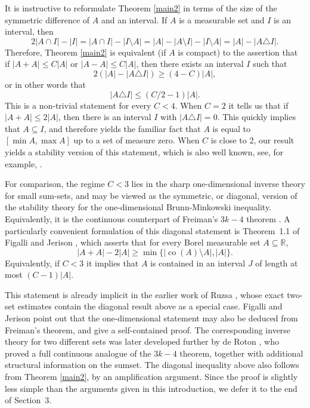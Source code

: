 \documentclass[11pt,reqno]{amsart}
\theoremstyle{definition}
\def\subset{\subseteq}
\begin{document}
It is instructive to reformulate Theorem \ref{main2} in terms of the size of the symmetric difference of $A$ and an interval. If $A$ is a measurable set and $I$ is an interval, then 
\[2|A\cap I|-|I|=|A\cap I|-|I\setminus A|=|A|-|A\setminus I|-|I\setminus A|=|A|-|A\triangle I|.\]
Therefore, Theorem \ref{main2} is equivalent (if $A$ is compact) to the assertion that if $|A+A|\leq C|A|$ or $|A-A|\leq C|A|$, then there exists an interval $I$ such that 
\[2(|A|-|A\triangle I|)\geq (4-C)|A|,\]
or in other words that
\[|A\triangle I|\leq(C/2-1)|A|.\]
This is a non-trivial statement for every $C<4$. When $C=2$ it tells us that if $|A+A|\leq 2|A|$, then there is an interval $I$ with $|A\triangle I|=0$. This quickly implies that $A\subset I$, and therefore yields the familiar fact that $A$ is equal to $[\min A,\max A]$ up to a set of measure zero. When $C$ is close to 2, our result yields a stability version of this statement, which is also well known, see, for example, \cite[Corollary~3.1]{Ruzsa1991}.


For comparison, the regime $C<3$ lies in the sharp one-dimensional inverse theory for small sum-sets, and may be viewed as the symmetric, or diagonal, version of the stability theory for the one-dimensional Brunn-Minkowski inequality. Equivalently, it is the continuous counterpart of Freiman's $3k-4$ theorem \cite{Freiman1959}. A particularly convenient formulation of this diagonal statement is Theorem~1.1 of Figalli and Jerison \cite{FigalliJerison2015}, which asserts that for every Borel measurable set $A\subset\mathbb R$,
\[
    |A+A|-2|A|
    \geq
    \min\bigl\{
        |\operatorname{co}(A)\setminus A|,
        |A|
    \bigr\}.
\]
Equivalently, if $C<3$ it implies that $A$ is contained in an interval $J$ of length at most $(C-1)|A|$. 

This statement is already implicit in the earlier work of Ruzsa
\cite{Ruzsa1991}, whose exact two-set estimates contain the diagonal
result above as a special case. Figalli and Jerison point out that the
one-dimensional statement may also be deduced from Freiman's theorem,
and give a self-contained proof. The corresponding inverse theory for
two different sets was later developed further by de Roton
\cite{deRoton2018}, who proved a full continuous analogue of the
$3k-4$ theorem, together with additional structural information on the
sumset. The diagonal
inequality above also follows from Theorem \ref{main2}, by an
amplification argument. Since the proof is slightly less simple than the arguments given in this introduction, we defer it to the end of Section~3. 
\end{document}
